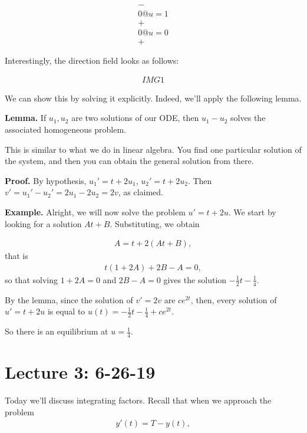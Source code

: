 \documentclass{article}
\begin{document}
\begin{align*}
  - \\
  0 @ u = 1 \\
  + \\
  0 @ u = 0 \\
  +
\end{align*}

Interestingly, the direction field looks as follows:

\begin{align*}
  IMG1
\end{align*}

We can show this by solving it explicitly.  Indeed, we'll apply the following lemma.

{\bf Lemma.} If $u_1, u_2$ are two solutions of our ODE, then $u_1 - u_2$ solves the associated homogeneous problem.  

This is similar to what we do in linear algebra.  You find one particular solution of the system, and then you can obtain the general solution from there.

{\bf Proof.} By hypothesis, $u_1' = t + 2u_1$, $u_2' = t + 2u_2$.  Then $v' = u_1' - u_2' = 2u_1 - 2u_2 = 2v$, as claimed.

{\bf Example.} Alright, we will now solve the problem $u' = t + 2u$.  We start by looking for a solution  $At + B$.  Substituting, we obtain

\begin{align*}
  A = t + 2(At + B),
\end{align*}
that is
\begin{align*}
  t(1 + 2A) + 2B - A = 0,
\end{align*}
so that solving $1 + 2A = 0$ and $2B - A = 0$ gives the solution $- \frac{1}{2}t - \frac{1}{4}$.

By the lemma, since the solution of $v' = 2v$ are $c e^{2t}$, then, every solution of $u' = t + 2u$ is equal to $u(t) = - \frac{1}{2}t - \frac{1}{4} + c e^{2t}$.

So there is an equilibrium at $u = \frac{1}{4}$.

\section{Lecture 3: 6-26-19}

Today we'll discuss integrating factors.  Recall that when we approach the problem
\begin{align*}
  y'(t) = T - y(t),
\end{align*}
\end{document}
